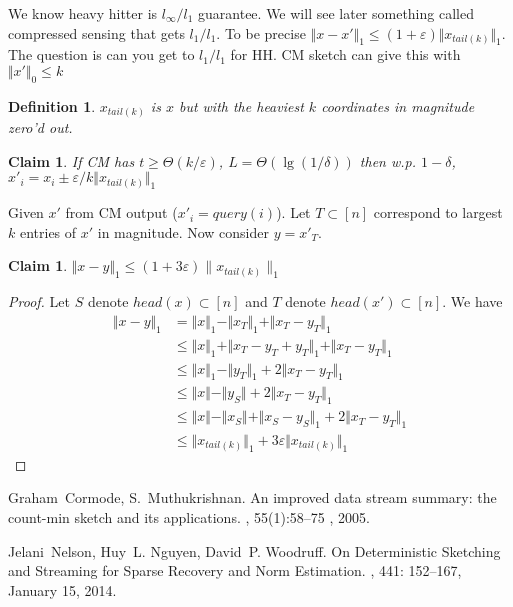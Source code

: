 \documentclass[11pt]{article}
\newtheorem{definition}[theorem]{Definition}
\newtheorem{claim}[theorem]{Claim}
\begin{document}
We know heavy hitter is $l_\infty/l_1$ guarantee. We will see later something called compressed sensing that gets $l_1/l_1$. To be precise $\Vert x-x'\Vert_1\leq (1+\varepsilon)\Vert x_{tail(k)}\Vert_1$. The question is can you get to $l_1/l_1$ for HH. CM sketch can give this with $\Vert x'\Vert_0\leq k$
\begin{definition}
$x_{tail(k)}$ is $x$ but with the heaviest $k$ coordinates in magnitude zero'd out.
\end{definition}
\begin{claim}
If CM has $t\geq \Theta(k/\varepsilon)$, $L=\Theta(\lg(1/\delta))$ then w.p. $1-\delta$, $x'_i=x_i\pm\varepsilon/k\Vert x_{tail(k)}\Vert_1$
\end{claim}

Given $x'$ from CM output ($x'_i=query(i)$). Let $T\subset[n]$ correspond to largest $k$ entries of $x'$ in magnitude. Now consider $y = x'_T$. 
\begin{claim}
$\Vert x-y\Vert_1\leq (1+3\varepsilon)\|x_{tail(k)}\|_1$
\end{claim}
\begin{proof}
Let $S$ denote $head(x)\subset[n]$ and $T$ denote $head(x')\subset[n]$. We have 
\begin{align*}
\Vert x-y\Vert_1 & = \Vert x\Vert_1 - \Vert x_T\Vert_1 + \Vert x_T-y_T\Vert_1\\ &\leq\Vert x\Vert_1 + \Vert x_T-y_T+y_T\Vert_1+\Vert x_T-y_T\Vert_1\\ &\leq \Vert x\Vert_1-\Vert y_T\Vert_1+2\Vert x_T-y_T\Vert_1\\ &\leq \Vert x\Vert - \Vert y_S\Vert + 2\Vert x_T-y_T\Vert_1\\ &\leq \Vert x\Vert - \Vert x_S\Vert+ \Vert x_S-y_S\Vert_1 + 2\Vert x_T-y_T\Vert_1\\ &\leq \Vert x_{tail(k)}\Vert_1+ 3\varepsilon \Vert x_{tail(k)}\Vert_1
\end{align*}
\end{proof}



\begin{thebibliography}{42}

Graham~Cormode, S.~Muthukrishnan.
\newblock An improved data stream summary: the count-min sketch and its applications.
, 55(1):58--75 , 2005.

Jelani~Nelson, Huy~L. Nguyen, David~P. Woodruff. 
\newblock On Deterministic Sketching and Streaming for Sparse Recovery and Norm Estimation.
, 441: 152--167, January 15,
2014.
\end{thebibliography}
\end{document}
